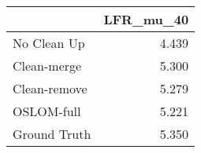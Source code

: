 \begin{tabular}{lr}
\toprule
{} & LFR_mu_40 \\
\midrule
No Clean Up  &     4.439 \\
Clean-merge  &     5.300 \\
Clean-remove &     5.279 \\
OSLOM-full   &     5.221 \\
Ground Truth &     5.350 \\
\bottomrule
\end{tabular}

